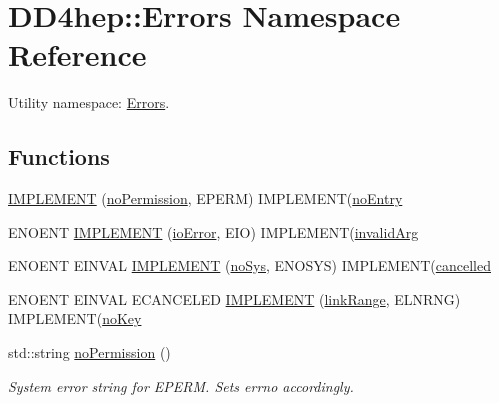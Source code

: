 \hypertarget{namespace_d_d4hep_1_1_errors}{}\section{D\+D4hep\+:\+:Errors Namespace Reference}
\label{namespace_d_d4hep_1_1_errors}


Utility namespace\+: \hyperlink{namespace_d_d4hep_1_1_errors}{Errors}.  


\subsection*{Functions}
\begin{DoxyCompactItemize}
\item 
\hyperlink{namespace_d_d4hep_1_1_errors_ada3397937d99e255f7b5770f5ab80888}{I\+M\+P\+L\+E\+M\+E\+NT} (\hyperlink{namespace_d_d4hep_1_1_errors_aa34e378024a1269ccd3f23a0c9d9607b}{no\+Permission}, E\+P\+E\+RM) I\+M\+P\+L\+E\+M\+E\+NT(\hyperlink{namespace_d_d4hep_1_1_errors_aca021db58d08e5935eea31a7d0b7d1b7}{no\+Entry}
\item 
E\+N\+O\+E\+NT \hyperlink{namespace_d_d4hep_1_1_errors_ae2932c4d59d7f6a7476733ba238050f6}{I\+M\+P\+L\+E\+M\+E\+NT} (\hyperlink{namespace_d_d4hep_1_1_errors_af232117521264a5f6e1211c887e265fd}{io\+Error}, E\+IO) I\+M\+P\+L\+E\+M\+E\+NT(\hyperlink{namespace_d_d4hep_1_1_errors_ab559bb58296daa1eed2725c602cb2483}{invalid\+Arg}
\item 
E\+N\+O\+E\+NT E\+I\+N\+V\+AL \hyperlink{namespace_d_d4hep_1_1_errors_a7875dfba79f4c8a0fbc5b9786730ca20}{I\+M\+P\+L\+E\+M\+E\+NT} (\hyperlink{namespace_d_d4hep_1_1_errors_a70d74e1cb3eced52822c830c2bf4990b}{no\+Sys}, E\+N\+O\+S\+YS) I\+M\+P\+L\+E\+M\+E\+NT(\hyperlink{namespace_d_d4hep_1_1_errors_a69cd23934005401444f50404ab454f53}{cancelled}
\item 
E\+N\+O\+E\+NT E\+I\+N\+V\+AL E\+C\+A\+N\+C\+E\+L\+ED \hyperlink{namespace_d_d4hep_1_1_errors_ad826680faeb314dfa60c60a0d4ee3692}{I\+M\+P\+L\+E\+M\+E\+NT} (\hyperlink{namespace_d_d4hep_1_1_errors_a6e59237308b289629424651a17eb8163}{link\+Range}, E\+L\+N\+R\+NG) I\+M\+P\+L\+E\+M\+E\+NT(\hyperlink{namespace_d_d4hep_1_1_errors_ace8817a7446265e17083aa87e73d6019}{no\+Key}
\item 
std\+::string \hyperlink{namespace_d_d4hep_1_1_errors_aa34e378024a1269ccd3f23a0c9d9607b}{no\+Permission} ()
\begin{DoxyCompactList}\small\item\em System error string for E\+P\+E\+RM. Sets errno accordingly. \end{DoxyCompactList}\item 

\end{DoxyCompactItemize}
